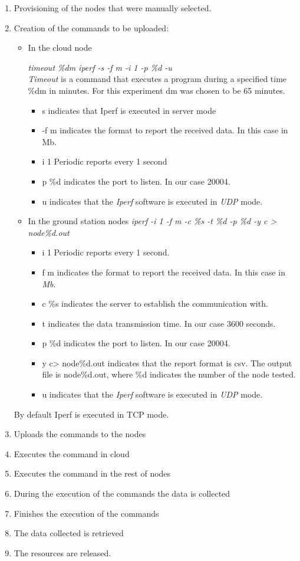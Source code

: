 \begin{enumerate}
\item Provisioning of the nodes that were manually selected.
\item Creation of the commands to be uploaded:
\begin{itemize}
\item In the cloud node

\emph{timeout \%dm iperf -s -f m -i 1 -p \%d -u} \\
\emph{Timeout} is a command that executes a program during a specified time \%dm in
minutes. For this experiment dm was chosen to be 65 minutes.
\begin{itemize}
\item s indicates that Iperf is executed in server mode
\item -f m indicates the format to report the received data. In this case in Mb.
\item i 1 Periodic reports every 1 second
\item p \%d indicates the port to listen. In our case 20004.
\item u indicates that the \emph{Iperf} software is executed in \emph{UDP} mode.
\end{itemize}

\item In the ground station nodes
\emph{iperf  -i 1 -f m -c \%s -t \%d -p \%d  -y c > node\%d.out}\\
\begin{itemize}
\item i 1 Periodic reports every 1 second.
\item f m indicates the format to report the received data. In this case in \emph{Mb}.
\item c \%s indicates the server to establish the communication with.
\item t indicates the data transmission time. In our case 3600 seconds.
\item p \%d indicates the port to listen. In our case 20004.
\item y c> node\%d.out indicates that the report format is csv. The output file
  is node\%d.out, where \%d indicates the number of the node tested.
\item u indicates that the \emph{Iperf} software is executed in \emph{UDP} mode.
\end{itemize}
\end{itemize}

By default Iperf is executed in TCP mode.

\item Uploads the commands to the nodes
\item Executes the command in cloud
\item Executes the command in the rest of nodes
\item During the execution of the commands the data is collected
\item Finishes the execution of the commands
\item The data collected is retrieved
\item The resources are released.
\end{enumerate}

